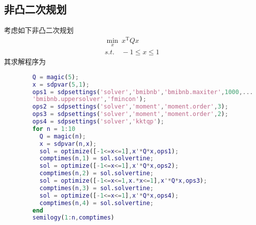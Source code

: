     \subsection{非凸二次规划}
        \par
        考虑如下非凸二次规划
        \begin{align*}
        & \min_x\ x^\mathrm{T}Qx \\
        & s.t.\quad -1 \leqslant x \leqslant 1
        \end{align*}
        其求解程序为
        \begin{lstlisting}[language = Matlab]
        %% 非凸二次规划
        Q = magic(5);
        x = sdpvar(5,1);
        ops1 = sdpsettings('solver','bmibnb','bmibnb.maxiter',1000,...
        'bmibnb.uppersolver','fmincon');
        ops2 = sdpsettings('solver','moment','moment.order',3);
        ops3 = sdpsettings('solver','moment','moment.order',2);
        ops4 = sdpsettings('solver','kktqp');
        for n = 1:10
          Q = magic(n);
          x = sdpvar(n,x);
          sol = optimize([-1<=x<=1],x'*Q*x,ops1);
          comptimes(n,1) = sol.solvertine;
          sol = optimize([-1<=x<=1],x'*Q*x,ops2);
          comptimes(n,2) = sol.solvertine;
          sol = optimize([-1<=x<=1,x.*x<=1],x'*Q*x,ops3);
          comptimes(n,3) = sol.solvertine;
          sol = optimize([-1<=x<=1],x'*Q*x,ops4);
          comptimes(n,4) = sol.solvertine;
        end
        semilogy(1:n,comptimes)
        \end{lstlisting}

